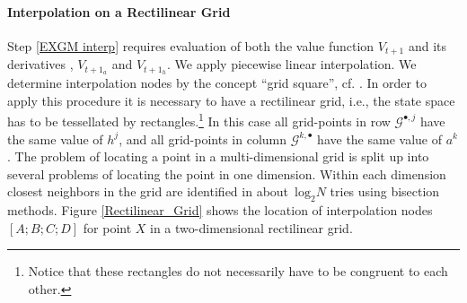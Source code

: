 \documentclass[a4paper,12pt]{article}%
\begin{document}
\paragraph{Interpolation on a Rectilinear Grid}

Step \ref{EXGM interp} requires evaluation of both the value function
$V_{t+1}$ and its derivatives , $V_{t+1_{a}}$ and $V_{t+1_{h}}$. We apply
piecewise linear interpolation. We determine interpolation nodes by the
concept \textquotedblleft grid square\textquotedblright, cf.
%
. In order to apply this procedure it is necessary to have a rectilinear grid,
i.e., the state space has to be tessellated by rectangles.\footnote{Notice
that these rectangles do not necessarily have to be congruent to each other.}
In this case all grid-points in row $\mathcal{G}^{\bullet,j}$ have the same
value of $h^{j}$, and all grid-points in column $\mathcal{G}^{k,\bullet}$ have
the same value of $a^{k}$. The problem of locating a point in a
multi-dimensional grid is split up into several problems of locating the point
in one dimension. Within each dimension closest neighbors in the grid are
identified in about~$\text{log}_{2}N$ tries using bisection methods. Figure
\ref{Rectilinear_Grid} shows the location of interpolation nodes $[A;B;C;D]$
for point $X$ in a two-dimensional rectilinear grid.
\end{document}
